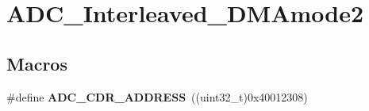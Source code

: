 \hypertarget{group___a_d_c___interleaved___d_m_amode2}{\section{A\-D\-C\-\_\-\-Interleaved\-\_\-\-D\-M\-Amode2}
\label{group___a_d_c___interleaved___d_m_amode2}
}
\subsection*{Macros}
\begin{DoxyCompactItemize}
\item 
\hypertarget{group___a_d_c___interleaved___d_m_amode2_gac40e36275945db0f5e81d48d2e0e3612}{\#define {\bfseries A\-D\-C\-\_\-\-C\-D\-R\-\_\-\-A\-D\-D\-R\-E\-S\-S}~((uint32\-\_\-t)0x40012308)}\label{group___a_d_c___interleaved___d_m_amode2_gac40e36275945db0f5e81d48d2e0e3612}

\end{DoxyCompactItemize}
